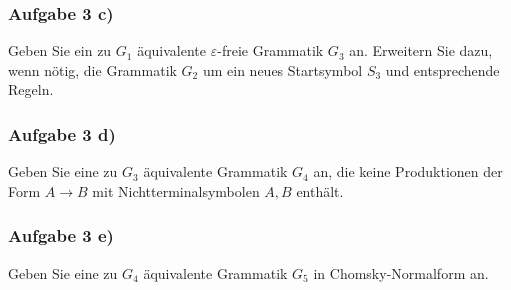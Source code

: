 \begin{lösung}
\end{lösung}

\subsubsection{Aufgabe 3 c)}
Geben Sie ein zu $G_1$ äquivalente $\varepsilon$-freie Grammatik $G_3$ an.
Erweitern Sie dazu, wenn nötig, die Grammatik $G_2$ um ein neues Startsymbol $S_3$ und entsprechende Regeln.

\begin{lösung}
\end{lösung}

\subsubsection{Aufgabe 3 d)}
Geben Sie eine zu $G_3$ äquivalente Grammatik $G_4$ an, die keine Produktionen der Form $A\to B$ mit Nichtterminalsymbolen $A,B$ enthält.

\begin{lösung}
\end{lösung}

\subsubsection{Aufgabe 3 e)}
Geben Sie eine zu $G_4$ äquivalente Grammatik $G_5$ in Chomsky-Normalform an.

\begin{lösung}
\end{lösung}